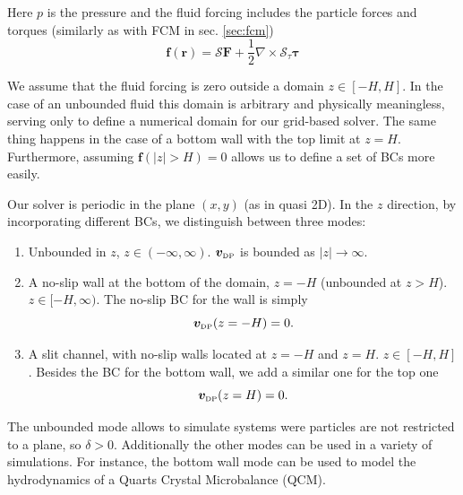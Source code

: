 \documentclass[ twoside,openright,titlepage,numbers=noenddot,%
headinclude,footinclude,cleardoublepage=empty,abstract=on,
BCOR=5mm,paper=a4,fontsize=11pt, dvipsnames
]{scrreprt}
\renewcommand{\vec}[1]{\bm{#1}}
\newcommand{\oper}[1]{\mathcal{#1}}
\newcommand{\half}{\frac{1}{2}}
\newcommand{\fpos}{r}
\newcommand{\fvel}{v}
\newcommand{\dpr}{\text{\tiny DP}}
\begin{document}
Here $p$ is the pressure and the fluid forcing includes the particle forces and torques (similarly as with \gls{FCM} in sec. \ref{sec:fcm})
\begin{equation}
  \vec{f}(\vec{\fpos}) = \oper{S}\vec{F} + \half\nabla\times\oper{S}_{\tau}\vec{\tau}
\end{equation}

We assume that the fluid forcing is zero outside a domain $z\in [-H, H]$. In the case of an unbounded fluid this domain is arbitrary and physically meaningless, serving only to define a numerical domain for our grid-based solver. The same thing happens in the case of a bottom wall with the top limit at $z=H$. Furthermore, assuming $\vec{f}(|z|>H) = 0$ allows us to define a set of \glspl{BC} more easily.

Our solver is periodic in the plane $(x,y)$ (as in quasi 2D). In the $z$ direction, by incorporating different \glspl{BC}, we distinguish between three modes:
\begin{enumerate}
\item Unbounded in $z$, $z\in(-\infty, \infty)$. $\vec{\fvel}_{\dpr}$ is bounded as $|z|\rightarrow\infty$.
\item A no-slip  wall at the bottom of the domain, $z=-H$ (unbounded at $z>H$). $z\in [-H, \infty)$.
  The no-slip \gls{BC} for the wall is simply
  \begin{equation}
    \label{eq:dpstokesbwvelbc}
    \vec{\fvel}_{\dpr}(z=-H) = 0.   
  \end{equation} 
\item A slit channel, with no-slip walls located at $z=-H$ and $z=H$. $z\in [-H, H]$. Besides the \gls{BC} for the bottom wall, we add a similar one for the top one
  \begin{equation}
    \label{eq:dpstokestwvelbc}
    \vec{\fvel}_{\dpr}(z=H) = 0.
  \end{equation}
\end{enumerate}
The unbounded mode allows to simulate systems were particles are not restricted to a plane, so $\delta>0$. Additionally the other modes can be used in a variety of simulations. For instance, the bottom wall mode can be used to model the hydrodynamics of a Quarts Crystal Microbalance (QCM).
\end{document}
